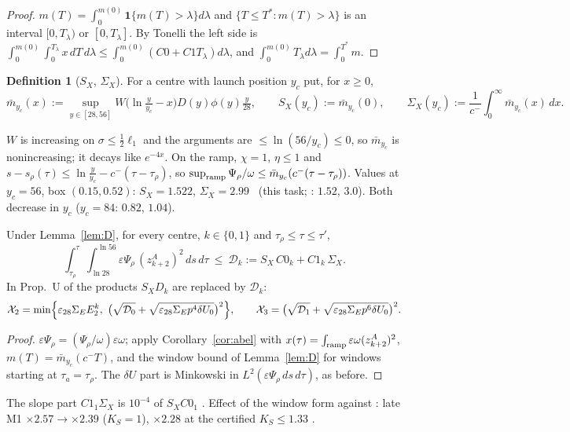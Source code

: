 \documentclass[11pt]{article}
\theoremstyle{definition}\newtheorem{definition}[theorem]{Definition}
\theoremstyle{remark}\newtheorem{remark}[theorem]{Remark}
\newcommand{\fn}[1]{\texttt{\detokenize{#1}}}
\begin{document}
\begin{proof}
$m(T)=\int_0^{m(0)}\mathbf 1\{m(T)>\lambda\}d\lambda$ and $\{T\le T^*:m(T)>\lambda\}$ is an interval $[0,T_\lambda)$ or $[0,T_\lambda]$. By Tonelli the left side is $\int_0^{m(0)}\!\int_0^{T_\lambda}x\,dT\,d\lambda\le\int_0^{m(0)}(C0+C1T_\lambda)d\lambda$, and $\int_0^{m(0)}T_\lambda d\lambda=\int_0^{T^*}m$.
\end{proof}
\begin{definition}[$S_X$, $\Sigma_X$]\label{def:SX}
For a centre with launch position $y_c$ put, for $x\ge0$,
\[
\bar m_{y_c}(x):=\sup_{y\in[28,56]}W\bigl(\ln\tfrac y{y_c}-x\bigr)D(y)\phi(y)\tfrac y{28},\qquad
S_X(y_c):=\bar m_{y_c}(0),\qquad\Sigma_X(y_c):=\frac1{c^-}\int_0^\infty\bar m_{y_c}(x)\,dx .
\]
\end{definition}
\noindent$W$ is increasing on $\sigma\le\frac12\ell_1$ and the arguments are $\le\ln(56/y_c)\le0$, so $\bar m_{y_c}$ is nonincreasing; it decays like $e^{-4x}$. On the ramp, $\chi=1$, $\eta\le1$ and $s-s_\rho(\tau)\le\ln\frac y{y_c}-c^-(\tau-\tau_\rho)$, so $\sup_{\rm ramp}\Psi_\rho/\omega\le\bar m_{y_c}(c^-(\tau-\tau_\rho))$. Values at $y_c=56$, box $(0.15,0.52)$: $S_X=1.522$, $\Sigma_X=2.99$ \tE\ (this task; \tR: $1.52$, $3.0$). Both decrease in $y_c$ ($y_c=84$: $0.82$, $1.04$).
\begin{proposition}\label{prop:Xterm}
Under Lemma~\ref{lem:D}, for every centre, $k\in\{0,1\}$ and $\tau_\rho\le\tau\le\tau'$,
\[
\int_{\tau_\rho}^{\tau}\!\!\int_{\ln28}^{\ln56}\varepsilon\Psi_\rho\,(z^A_{k+2})^2\,ds\,d\tau\ \le\ \mathcal D_k:=S_X\,C0_k+C1_k\,\Sigma_X .
\]
In Prop.~U of \fn{U_ramp.tex} the products $S_XD_k$ are replaced by $\mathcal D_k$:
\[
\mathcal X_2=\min\Bigl\{\varepsilon_{28}\Sigma_EE^k_2,\ \bigl(\sqrt{\mathcal D_0}+\sqrt{\varepsilon_{28}\Sigma_Ep^4\delta U_0}\bigr)^2\Bigr\},\qquad
\mathcal X_3=\bigl(\sqrt{\mathcal D_1}+\sqrt{\varepsilon_{28}\Sigma_Ep^6\delta U_0}\bigr)^2 .
\]
\end{proposition}
\begin{proof}
$\varepsilon\Psi_\rho=(\Psi_\rho/\omega)\varepsilon\omega$; apply Corollary~\ref{cor:abel} with $x(\tau)=\int_{\rm ramp}\varepsilon\omega(z^A_{k+2})^2$, $m(T)=\bar m_{y_c}(c^-T)$, and the window bound of Lemma~\ref{lem:D} for windows starting at $\tau_a=\tau_\rho$. The $\delta U$ part is Minkowski in $L^2(\varepsilon\Psi_\rho\,ds\,d\tau)$, as before.
\end{proof}
\noindent The slope part $C1_1\Sigma_X$ is $10^{-4}$ of $S_XC0_1$ \tR. Effect of the window form against \fn{U_model2_A1}: late M1 $\times2.57\to\times2.39$ ($K_S=1$), $\times2.28$ at the certified $K_S\le1.33$ \tR.
\end{document}
